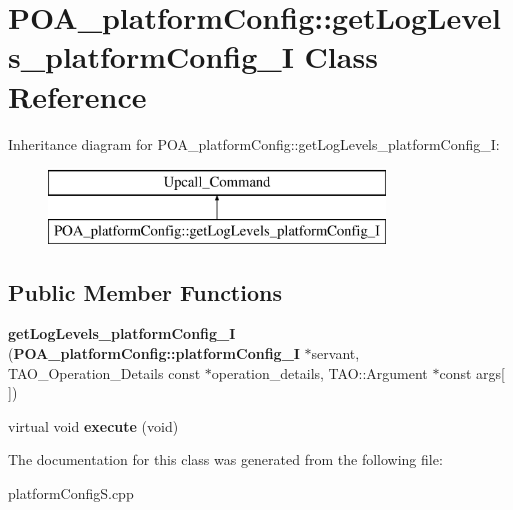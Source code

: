 \section{P\+O\+A\+\_\+platform\+Config\+:\+:get\+Log\+Levels\+\_\+platform\+Config\+\_\+I Class Reference}
\label{classPOA__platformConfig_1_1getLogLevels__platformConfig__I}
Inheritance diagram for P\+O\+A\+\_\+platform\+Config\+:\+:get\+Log\+Levels\+\_\+platform\+Config\+\_\+I\+:\begin{figure}[H]
\begin{center}
\leavevmode
\includegraphics[height=2.000000cm]{classPOA__platformConfig_1_1getLogLevels__platformConfig__I}
\end{center}
\end{figure}
\subsection*{Public Member Functions}
\begin{DoxyCompactItemize}
\item 
{\bfseries get\+Log\+Levels\+\_\+platform\+Config\+\_\+I} ({\bf P\+O\+A\+\_\+platform\+Config\+::platform\+Config\+\_\+I} $\ast$servant, T\+A\+O\+\_\+\+Operation\+\_\+\+Details const $\ast$operation\+\_\+details, T\+A\+O\+::\+Argument $\ast$const args[$\,$])\label{classPOA__platformConfig_1_1getLogLevels__platformConfig__I_a03a1e5fc57af5f13f5ad073c73ba0d96}

\item 
virtual void {\bfseries execute} (void)\label{classPOA__platformConfig_1_1getLogLevels__platformConfig__I_ae5a10dd63099b01ef5eaabfc8f544571}

\end{DoxyCompactItemize}


The documentation for this class was generated from the following file\+:\begin{DoxyCompactItemize}
\item 
platform\+Config\+S.\+cpp\end{DoxyCompactItemize}
